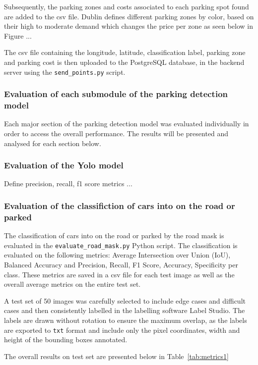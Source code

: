 Subsequently, the parking zones and costs associated to each parking spot found are added to the csv file.
Dublin defines different parking zones by color, based on their high to moderate demand which changes the price per zone as seen below in Figure ...

The csv file containing the longitude, latitude, classification label, parking zone and parking cost is then uploaded to the PostgreSQL database, in the backend server using the \texttt{send\_points.py} script.

\subsubsection{Evaluation of each submodule of the parking detection model}
Each major section of the parking detection model was evaluated individually in order to access the overall performance. The results will be presented and analysed for each section below.

\subsubsection{Evaluation of the Yolo model}
Define precision, recall, f1 score metrics ...

\subsubsection{Evaluation of the classifiction of cars into on the road or parked}
The classification of cars into on the road or parked by the road mask is evaluated in the \texttt{evaluate\_road\_mask.py} Python script.
The classification is evaluated on the following metrics: Average Intersection over Union (IoU), Balanced Accuracy and Precision, Recall, F1 Score, Accuracy, Specificity per class. These metrics are saved in a csv file for each test image as well as the overall average metrics on the entire test set.

A test set of 50 images was carefully selected to include edge cases and difficult cases and then consistently labelled in the labelling software Label Studio. The labels are drawn without rotation to ensure the maximum overlap, as the labels are exported to \texttt{txt} format and include only the pixel coordinates, width and  height of the bounding boxes annotated.

The overall results on test set are presented below in Table~\ref{tab:metrics1}

